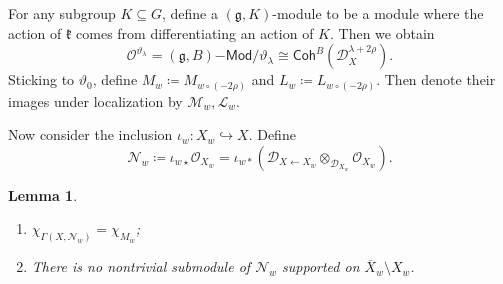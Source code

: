 \documentclass[leqno, openany]{memoir}
\newtheorem{lem}[thm]{Lemma}
\theoremstyle{definition}
\theoremstyle{remark}
\theoremstyle{plain}
\theoremstyle{definition}
\theoremstyle{remark}
\newcommand{\g}{\mathfrak{g}}
\newcommand{\mc}[1]{\mathcal{#1}}
\newcommand{\mf}[1]{\mathfrak{#1}}
\newcommand{\ms}[1]{\mathsf{#1}}
\newcommand{\ol}[1]{\overline{#1}}
\begin{document}
For any subgroup $K \subseteq G$, define a $(\g, K)$-module to be a module where the action of $\mf{k}$ comes from differentiating an action of $K$. Then we obtain
\[ \mc{O}^{\vartheta_{\lambda}} = (\g, B)\ms{-Mod}/\vartheta_{\lambda} \cong \ms{Coh}^B(\mc{D}_X^{\lambda + 2\rho}). \]
Sticking to $\vartheta_0$, define $M_w \coloneqq M_{w \circ (-2\rho)}$ and $L_w \coloneqq L_{w \circ (-2\rho)}$. Then denote their images under localization by $\mc{M}_w, \mc{L}_w$. 

Now consider the inclusion $\iota_w \colon X_w \hookrightarrow X$. Define
\[ \mc{N}_w \coloneqq \iota_{w \star} \mc{O}_{X_w} = \iota_{w*}(\mc{D}_{X \gets X_w} \otimes_{\mc{D}_{X_w}} \mc{O}_{X_w}). \]

\begin{lem}\leavevmode
    \begin{enumerate}
        \item $\chi_{\Gamma(X, \mc{N}_w)} = \chi_{M_w}$;
        \item There is no nontrivial submodule of $\mc{N}_w$ supported on $\ol{X}_w \setminus X_w$.
    \end{enumerate}
\end{lem}
\end{document}
